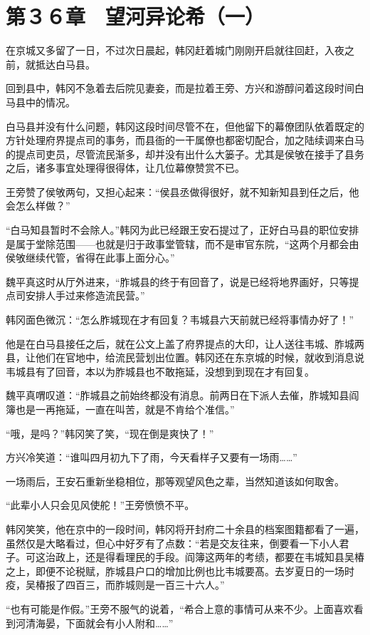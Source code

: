 \section{第３６章　望河异论希（一）}

在京城又多留了一日，不过次日晨起，韩冈赶着城门刚刚开启就往回赶，入夜之前，就抵达白马县。

回到县中，韩冈不急着去后院见妻妾，而是拉着王旁、方兴和游醇问着这段时间白马县中的情况。

白马县并没有什么问题，韩冈这段时间尽管不在，但他留下的幕僚团队依着既定的方针处理府界提点司的事务，而县衙的一干属僚也都密切配合，加之陆续调来白马的提点司吏员，尽管流民渐多，却并没有出什么大篓子。尤其是侯敂在接手了县务之后，诸多事宜处理得很得体，让几位幕僚赞赏不已。

王旁赞了侯敂两句，又担心起来：“侯县丞做得很好，就不知新知县到任之后，他会怎么样做？”

“白马知县暂时不会除人。”韩冈为此已经跟王安石提过了，正好白马县的职位安排是属于堂除范围——也就是归于政事堂管辖，而不是审官东院，“这两个月都会由侯敂继续代管，省得在此事上面分心。”

魏平真这时从厅外进来，“胙城县的终于有回音了，说是已经将地界画好，只等提点司安排人手过来修造流民营。”

韩冈面色微沉：“怎么胙城现在才有回复？韦城县六天前就已经将事情办好了！”

他是在白马县接任之后，就在公文上盖了府界提点的大印，让人送往韦城、胙城两县，让他们在官地中，给流民营划出位置。韩冈还在东京城的时候，就收到消息说韦城县有了回音，本以为胙城县也不敢拖延，没想到到现在才有回复。

魏平真喟叹道：“胙城县之前始终都没有消息。前两日在下派人去催，胙城知县阎簿也是一再拖延，一直在叫苦，就是不肯给个准信。”

“哦，是吗？”韩冈笑了笑，“现在倒是爽快了！”

方兴冷笑道：“谁叫四月初九下了雨，今天看样子又要有一场雨……”

一场雨后，王安石重新坐稳相位，那等观望风色之辈，当然知道该如何取舍。

“此辈小人只会见风使舵！”王旁愤愤不平。

韩冈笑笑，他在京中的一段时间，韩冈将开封府二十余县的档案图籍都看了一遍，虽然仅是大略看过，但心中好歹有了点数：“若是交友往来，倒要看一下小人君子。可这治政上，还是得看理民的手段。阎簿这两年的考绩，都要在韦城知县吴椿之上，即便不论税赋，胙城县户口的增加比例也比韦城要髙。去岁夏日的一场时疫，吴椿报了四百三，而胙城则是一百三十六人。”

“也有可能是作假。”王旁不服气的说着，“希合上意的事情可从来不少。上面喜欢看到河清海晏，下面就会有小人附和……”

